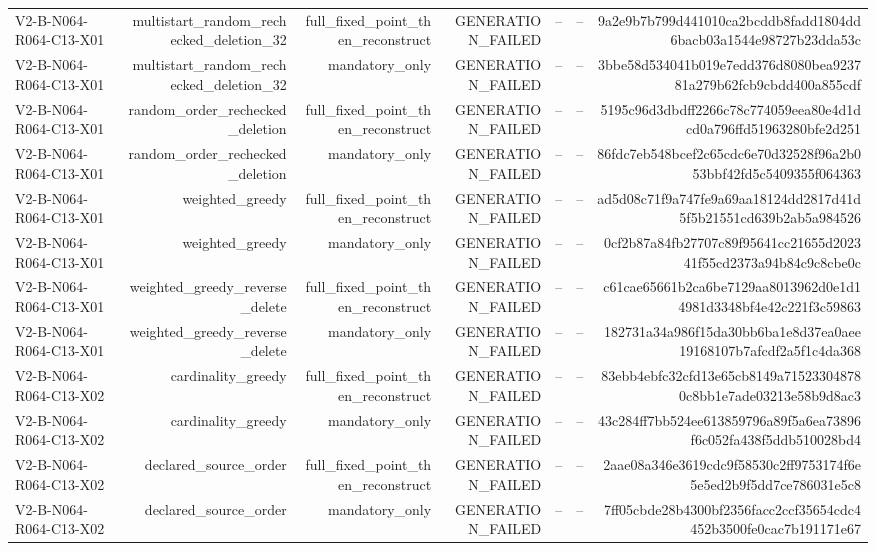{\begin{longtable}{lrrrrrr}
V2-B-N064-R064-C13-X01 & multistart\_random\_rechecked\_deletion\_32 & full\_fixed\_point\_then\_reconstruct & GENERATION\_FAILED & -- & -- & 9a2e9b7b799d441010ca2bcddb8fadd1804dd6bacb03a1544e98727b23dda53c \\
V2-B-N064-R064-C13-X01 & multistart\_random\_rechecked\_deletion\_32 & mandatory\_only & GENERATION\_FAILED & -- & -- & 3bbe58d534041b019e7edd376d8080bea923781a279b62fcb9cbdd400a855cdf \\
V2-B-N064-R064-C13-X01 & random\_order\_rechecked\_deletion & full\_fixed\_point\_then\_reconstruct & GENERATION\_FAILED & -- & -- & 5195c96d3dbdff2266c78c774059eea80e4d1dcd0a796ffd51963280bfe2d251 \\
V2-B-N064-R064-C13-X01 & random\_order\_rechecked\_deletion & mandatory\_only & GENERATION\_FAILED & -- & -- & 86fdc7eb548bcef2c65cdc6e70d32528f96a2b053bbf42fd5c5409355f064363 \\
V2-B-N064-R064-C13-X01 & weighted\_greedy & full\_fixed\_point\_then\_reconstruct & GENERATION\_FAILED & -- & -- & ad5d08c71f9a747fe9a69aa18124dd2817d41d5f5b21551cd639b2ab5a984526 \\
V2-B-N064-R064-C13-X01 & weighted\_greedy & mandatory\_only & GENERATION\_FAILED & -- & -- & 0cf2b87a84fb27707c89f95641cc21655d202341f55cd2373a94b84c9c8cbe0c \\
V2-B-N064-R064-C13-X01 & weighted\_greedy\_reverse\_delete & full\_fixed\_point\_then\_reconstruct & GENERATION\_FAILED & -- & -- & c61cae65661b2ca6be7129aa8013962d0e1d14981d3348bf4e42c221f3c59863 \\
V2-B-N064-R064-C13-X01 & weighted\_greedy\_reverse\_delete & mandatory\_only & GENERATION\_FAILED & -- & -- & 182731a34a986f15da30bb6ba1e8d37ea0aee19168107b7afcdf2a5f1c4da368 \\
V2-B-N064-R064-C13-X02 & cardinality\_greedy & full\_fixed\_point\_then\_reconstruct & GENERATION\_FAILED & -- & -- & 83ebb4ebfc32cfd13e65cb8149a715233048780c8bb1e7ade03213e58b9d8ac3 \\
V2-B-N064-R064-C13-X02 & cardinality\_greedy & mandatory\_only & GENERATION\_FAILED & -- & -- & 43c284ff7bb524ee613859796a89f5a6ea73896f6c052fa438f5ddb510028bd4 \\
V2-B-N064-R064-C13-X02 & declared\_source\_order & full\_fixed\_point\_then\_reconstruct & GENERATION\_FAILED & -- & -- & 2aae08a346e3619cdc9f58530c2ff9753174f6e5e5ed2b9f5dd7ce786031e5c8 \\
V2-B-N064-R064-C13-X02 & declared\_source\_order & mandatory\_only & GENERATION\_FAILED & -- & -- & 7ff05cbde28b4300bf2356facc2ccf35654cdc4452b3500fe0cac7b191171e67 \\

\end{longtable}}
